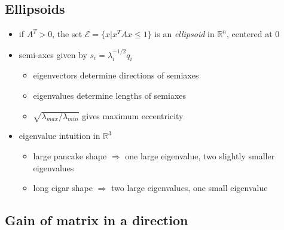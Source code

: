 \documentclass[10pt,letterpaper]{article}
\begin{document}
\subsection{Ellipsoids}
\label{sec-15_4}

\begin{itemize}
\item if $A ^{T} > 0$, the set $\mathcal E = \{x | x ^{T} Ax \le 1 \}$ is an \emph{ellipsoid} in $\mathbb{R}^{n}$, centered at 0
\item semi-axes given by $s _{i} = \lambda _{i} ^{-1/2} q _{i}$

\begin{itemize}
\item eigenvectors determine directions of semiaxes
\item eigenvalues determine lengths of semiaxes
\item $\sqrt{\lambda_{max} / \lambda_{min}}$ gives maximum eccentricity
\end{itemize}

\item eigenvalue intuition in $\mathbb{R}^{3}$

\begin{itemize}
\item large pancake shape $\Rightarrow$ one large eigenvalue, two slightly smaller eigenvalues
\item long cigar shape $\Rightarrow$ two large eigenvalues, one small eigenvalue
\end{itemize}

\end{itemize}
\subsection{Gain of matrix in a direction}
\label{sec-15_5}
\end{document}

